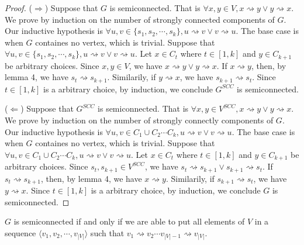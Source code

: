 \begin{proof}
    ($\Longrightarrow$)
    Suppose that $G$ is semiconnected.
    That is $\forall x,y \in V, x \rightsquigarrow y \vee y \rightsquigarrow x$.
    We prove by induction on the number of strongly connected components of $G$.
    Our inductive hypothesis is 
    $\forall u,v \in \{ s_1, s_2, \cdots, s_k \}, u \rightsquigarrow v \vee v \rightsquigarrow u$.
    The base case is when $G$ containes no vertex, which is trivial.
    Suppose that 
    $\forall u,v \in \{ s_1, s_2, \cdots, s_k \}, u \rightsquigarrow v \vee v \rightsquigarrow u$.
    Let $x \in C_t$ where $t \in [1,k]$ and $y \in C_{k+1}$ be arbitrary choices.
    Since $x,y \in V$, we have $x \rightsquigarrow y \vee y \rightsquigarrow x$.
    If $x \rightsquigarrow y$, then, by lemma 4, we have $s_t \rightsquigarrow s_{k+1}$.
    Similarily, if $y \rightsquigarrow x$, we have $s_{k+1} \rightsquigarrow s_t$.
    Since $t \in [1,k]$ is a arbitrary choice, by induction,
    we conclude $G^{SCC}$ is semiconnected.

    ($\Longleftarrow$)
    Suppose that $G^{SCC}$ is semiconnected.
    That is $\forall x,y \in V^{SCC}, x \rightsquigarrow y \vee y \rightsquigarrow x$.
    We prove by induction on the number of strongly connectly components of $G$.
    Our inductive hypothesis is 
    $\forall u,v \in C_1 \cup C_2 \cdots C_k, u \rightsquigarrow v \vee v \rightsquigarrow u$.
    The base case is when $G$ containes no vertex, which is trivial.
    Suppose that 
    $\forall u,v \in C_1 \cup C_2 \cdots C_k, u \rightsquigarrow v \vee v \rightsquigarrow u$.
    Let $x \in C_t$ where $t \in [1,k]$ and $y \in C_{k+1}$ be arbitrary choices.
    Since $s_t,s_{k+1} \in V^{SCC}$, we have 
    $s_t \rightsquigarrow s_{k+1} \vee s_{k+1} \rightsquigarrow s_t$.
    If $s_t \rightsquigarrow s_{k+1}$, then, by lemma 4, we have $x \rightsquigarrow y$.
    Similarily, if $s_{k+1} \rightsquigarrow s_t$, we have $y \rightsquigarrow x$.
    Since $t \in [1,k]$ is a arbitrary choice, by induction,
    we conclude $G$ is semiconnected.
\end{proof}

\begin{lemma}
    $G$ is semiconnected if and only if
    we are able to put all elements of $V$ in a sequence 
    $\langle v_1, v_2, \cdots, v_{|V|} \rangle$ such that 
    $v_1 \rightsquigarrow v_2 \cdots v_{|V|-1} \rightsquigarrow v_{|V|}$.
\end{lemma}

